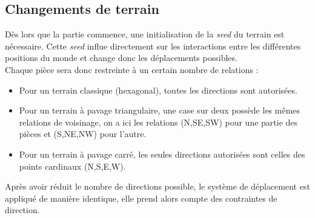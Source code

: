     \subsection{Changements de terrain}
        Dès lors que la partie commence, une initialisation de la \textit{seed} du terrain est nécessaire.
        \medbreak
        Cette \textit{seed} influe directement sur les interactions entre les différentes positions du monde et change donc les déplacements possibles. \\ Chaque pièce sera donc restreinte à un certain nombre de relations :
        \begin{itemize}
            \item Pour un terrain classique (hexagonal), toutes les directions sont autorisées.
            \item Pour un terrain à pavage triangulaire, une case sur deux possède les mêmes relations de voisinage, on a ici les relations (N,SE,SW) pour une partie des pièces et (S,NE,NW) pour l'autre.
            \item Pour un terrain à pavage carré, les seules directions autorisées sont celles des points cardinaux (N,S,E,W).
        \end{itemize}
        \medbreak
        Après avoir réduit le nombre de directions possible, le système de déplacement est appliqué de manière identique, elle prend alors compte des contraintes de direction.
        \medbreak
